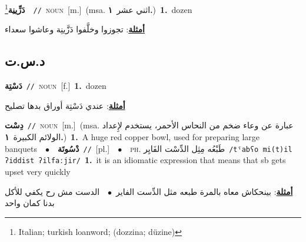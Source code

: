 \documentclass[10pt,a4paper,twoside]{article} %
\begin{document}
\begin{multicols}{2}
{\setlength\topsep{0pt}\textbf{\foreignlanguage{arabic}{دَزِّينِة}}\footnote{Italian; turkish loanword; (dozzina; düzine)}\ \ {\color{gray}\texttt{//}\color{black}}\ \textsc{noun}\ [m.]\ \color{gray}(msa. \foreignlanguage{arabic}{اثني عشر}~\foreignlanguage{arabic}{\textbf{١.}})\color{black}\ \textbf{1.}~dozen\  \begin{flushright}\color{gray}\foreignlanguage{arabic}{\textbf{\underline{\foreignlanguage{arabic}{أمثلة}}}: تجوزوا وخلَّفوا دَزَّينِة وعاشوا سعداء}\end{flushright}\color{black}} \vspace{2mm}

\vspace{-3mm}
\subsection*{\color{blue}\foreignlanguage{arabic}{د.س.ت}\color{blue}{}} 

{\setlength\topsep{0pt}\textbf{\foreignlanguage{arabic}{دَسْتِة}}\ {\color{gray}\texttt{//}\color{black}}\ \textsc{noun}\ [f.]\ \textbf{1.}~dozen\  \begin{flushright}\color{gray}\foreignlanguage{arabic}{\textbf{\underline{\foreignlanguage{arabic}{أمثلة}}}: عندي دَسْتِة أوراق بدها تصليح}\end{flushright}\color{black}} \vspace{2mm}

{\setlength\topsep{0pt}\textbf{\foreignlanguage{arabic}{دِسْت}}\ {\color{gray}\texttt{//}\color{black}}\ \textsc{noun}\ [m.]\ \color{gray}(msa. \foreignlanguage{arabic}{عبارة عن وعاء ضخم من النحاس الأحمر، يستخدم لإِعداد الولائم الكبيرة}~\foreignlanguage{arabic}{\textbf{١.}})\color{black}\ \textbf{1.}~A huge red copper bowl, used for preparing large banquets\ \ $\bullet$\ \ \setlength\topsep{0pt}\textbf{\foreignlanguage{arabic}{دْسُوتَة}}\ {\color{gray}\texttt{//}\color{black}}\ [pl.]\ \ $\bullet$\ \ \textsc{ph.} \color{gray} \foreignlanguage{arabic}{طَبْعُه مِثِل الدِّسْت الفَايِر}\color{black}\ {\color{gray}\texttt{/{\sffamily tˤabʕo mi(t)il ʔiddist ʔilfaːjir}/}\color{black}}\ \textbf{1.}~it is an idiomatic expression that means that sb gets upset very quickly\  \begin{flushright}\color{gray}\foreignlanguage{arabic}{\textbf{\underline{\foreignlanguage{arabic}{أمثلة}}}: بينحكاش معاه بالمرة طبعه مثل الدِّست الفاير\ $\bullet$\ \  الدست مش رح يكفي للأكل بدنا كمان واحد}\end{flushright}\color{black}} \vspace{2mm}


\end{multicols}
\end{document}
